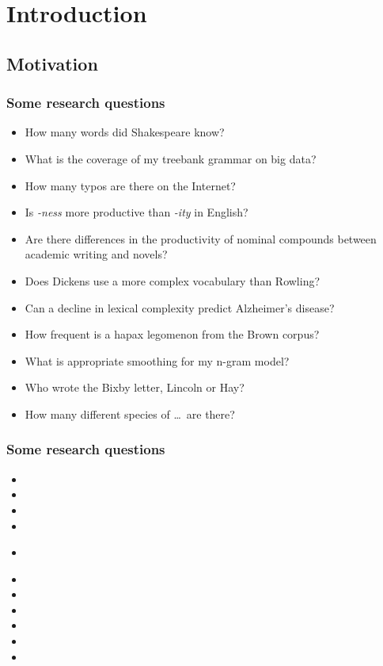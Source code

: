\documentclass[t]{beamer} %
\begin{document}
\section{Introduction}

\subsection{Motivation}

\begin{frame}
  \frametitle{Some research questions}

  \begin{itemize}
  \item How many words did Shakespeare know?
  \item What is the coverage of my treebank grammar on big data?
  \item How many typos are there on the Internet?
  \item Is \emph{-ness} more productive than \emph{-ity} in English?
  \item Are there differences in the productivity of nominal compounds between academic writing and novels?
  \item Does Dickens use a more complex vocabulary than Rowling?
  \item Can a decline in lexical complexity predict Alzheimer's disease?
  \item How frequent is a hapax legomenon from the Brown corpus?
  \item What is appropriate smoothing for my n-gram model?
  \item Who wrote the Bixby letter, Lincoln or Hay?
  \item How many different species of \ldots\ are there? \citep{Brainerd:82}
  \end{itemize}
\end{frame}

\begin{frame}
  \frametitle{Some research questions}

  \begin{itemize}
  \item {}
  \item {}
  \item {}
  \item {}
  \item {}\\\rule{0mm}{1ex}
  \item {}
  \item {}
  \item {}
  \item {}
  \item {}
  \item {}
  \end{itemize}
\end{frame}
\end{document}
